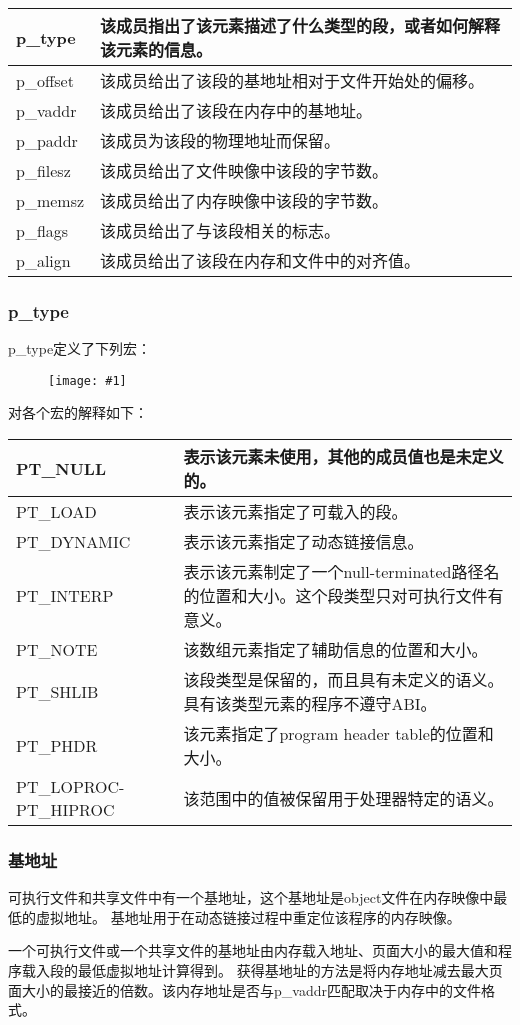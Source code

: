 \documentclass[a4paper,left=2.5cm,right=2.5cm,11pt]{article}
\newcommand{\fic}[1]{\begin{figure}[H]
		\center
		\texttt{[image: \#1]}
	\end{figure}}
\newcommand{\interval}{\vspace{0.5em}}
\begin{document}
	\interval
	\begin{longtable}{p{1.5cm}p{9cm}}
	\hline
	p\_type & 该成员指出了该元素描述了什么类型的段，或者如何解释该元素的信息。\\
	\hline
	p\_offset & 该成员给出了该段的基地址相对于文件开始处的偏移。\\
	\hline
	p\_vaddr & 该成员给出了该段在内存中的基地址。\\
	\hline
	p\_paddr & 该成员为该段的物理地址而保留。\\
	\hline
	p\_filesz & 该成员给出了文件映像中该段的字节数。\\
	\hline
	p\_memsz & 该成员给出了内存映像中该段的字节数。\\
	\hline
	p\_flags & 该成员给出了与该段相关的标志。\\
	\hline
	p\_align & 该成员给出了该段在内存和文件中的对齐值。\\
	\hline 
	\end{longtable}
	\interval

\subsubsection{p\_type}
	p\_type定义了下列宏：
	\fic{23.png}

	对各个宏的解释如下：
	\interval
	\begin{longtable}{p{2cm}p{9cm}}
	\hline
	PT\_NULL & 表示该元素未使用，其他的成员值也是未定义的。\\
	\hline
	PT\_LOAD & 表示该元素指定了可载入的段。\\
	\hline
	PT\_DYNAMIC & 表示该元素指定了动态链接信息。\\
	\hline
	PT\_INTERP & 表示该元素制定了一个null-terminated路径名的位置和大小。这个段类型只对可执行文件有意义。\\
	\hline
	PT\_NOTE & 该数组元素指定了辅助信息的位置和大小。\\
	\hline
	PT\_SHLIB & 该段类型是保留的，而且具有未定义的语义。具有该类型元素的程序不遵守ABI。\\
	\hline
	PT\_PHDR & 该元素指定了program header table的位置和大小。\\
	\hline
	PT\_LOPROC-PT\_HIPROC & 该范围中的值被保留用于处理器特定的语义。\\
	\hline
	\end{longtable}
	\interval

\subsubsection{基地址}
	可执行文件和共享文件中有一个基地址，这个基地址是object文件在内存映像中最低的虚拟地址。
	基地址用于在动态链接过程中重定位该程序的内存映像。\par
	一个可执行文件或一个共享文件的基地址由内存载入地址、页面大小的最大值和程序载入段的最低虚拟地址计算得到。
	获得基地址的方法是将内存地址减去最大页面大小的最接近的倍数。该内存地址是否与p\_vaddr匹配取决于内存中的文件格式。\par
\end{document}
